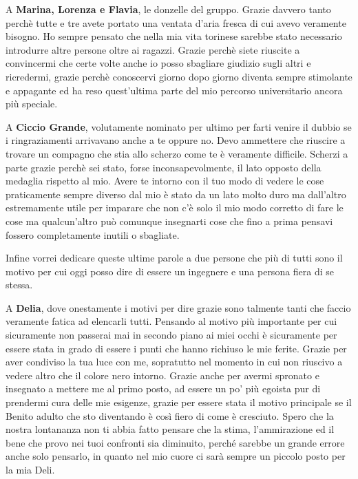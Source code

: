 \documentclass[cucitura%
,12pt%
]{toptesi}
\begin{document}
A \textbf{Marina, Lorenza e Flavia}, le donzelle del gruppo. Grazie davvero tanto perchè tutte e tre avete portato una ventata d'aria fresca di cui avevo veramente bisogno. Ho sempre pensato che nella mia vita torinese sarebbe stato necessario introdurre altre persone oltre ai ragazzi. Grazie perchè siete riuscite a convincermi che certe volte anche io posso sbagliare
giudizio sugli altri e ricredermi, grazie perchè conoscervi giorno dopo giorno diventa sempre stimolante e appagante ed ha reso quest'ultima parte del mio percorso universitario ancora più speciale.

A \textbf{Ciccio Grande}, volutamente nominato per ultimo per farti venire il dubbio se i ringraziamenti arrivavano anche a te oppure no. Devo ammettere che riuscire a trovare un compagno che stia allo scherzo come te è veramente difficile. Scherzi a parte grazie perchè sei stato, forse inconsapevolmente, il lato opposto della medaglia rispetto al mio.
Avere te intorno con il tuo modo di vedere le cose praticamente sempre diverso dal mio è stato da un lato molto duro ma dall'altro estremamente utile per imparare che non c'è solo il mio modo corretto di fare le cose ma qualcun'altro può comunque insegnarti cose che fino a prima pensavi fossero completamente inutili o sbagliate. 

Infine vorrei dedicare queste ultime parole a due persone che più di tutti sono il motivo per cui oggi posso dire di essere un ingegnere e una persona fiera di se stessa. 

A \textbf{Delia}, dove onestamente i motivi per dire grazie sono talmente tanti che faccio veramente fatica ad elencarli tutti. Pensando al motivo più importante per cui sicuramente non passerai mai in secondo piano ai miei occhi è 
sicuramente per essere stata in grado di essere i punti che hanno richiuso le mie ferite. Grazie per aver condiviso la tua luce con me, sopratutto nel momento in cui non riuscivo a vedere altro che il colore nero intorno. 
Grazie anche per avermi spronato e insegnato a mettere me al primo posto, ad essere un po’ più egoista pur di prendermi cura delle mie esigenze, grazie per essere stata il motivo principale se il Benito adulto che sto diventando è così fiero di come è cresciuto. 
Spero che la nostra lontananza non ti abbia fatto pensare che la stima, l’ammirazione ed il bene che provo nei tuoi confronti sia diminuito, perché sarebbe un grande errore anche solo pensarlo, in quanto nel mio cuore ci sarà sempre un piccolo posto per la mia Deli.
\end{document}
